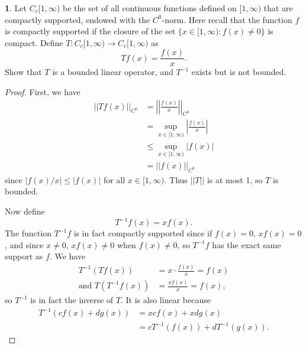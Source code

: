 \documentclass[12pt]{article}
\theoremstyle{definition}
\newtheorem{ex}{}
\begin{document}
\begin{ex}
	Let $C_c[1, \infty)$ be the set of all continuous functions defined on $[1, \infty)$ that are compactly supported, endowed with the $C^0$-norm.
	Here recall that the function $f$ is compactly supported if the closure of the set $\lbrace x \in [1, \infty) : f(x) \neq 0 \rbrace$ is compact.
	Define $T : C_c[1, \infty) \to C_c[1, \infty)$ as \begin{equation*}
		Tf(x) = \frac{f(x)}{x}.
	\end{equation*}
	Show that $T$ is a bounded linear operator, and $T^{-1}$ exists but is not bounded.
\end{ex}
\begin{proof}
	First, we have \begin{align*}
		||Tf(x)||_{C^0} & = \left| \left| \frac{f(x)}{x} \right| \right|_{C^0}     \\
		                & = \sup_{x \in [1, \infty)} \left| \frac{f(x)}{x} \right| \\
		                & \leq \sup_{x \in [1, \infty)} \left| f(x) \right|        \\
		                & = \left| \left| f(x) \right| \right|_{C^0}
	\end{align*}
	since $|f(x)/x| \leq |f(x)|$ for all $x \in [1, \infty)$.
	Thus $||T||$ is at most 1, so $T$ is bounded.

	Now define \begin{equation*}
		T^{-1}f(x) = xf(x).
	\end{equation*}
	The function $T^{-1}f$ is in fact compactly supported since if $f(x) = 0$, $xf(x) = 0$, and since $x \neq 0$, $xf(x) \neq 0$ when $f(x) \neq 0$, so $T^{-1}f$ has the exact same support as $f$.
	We have \begin{align*}
		T^{-1}(Tf(x))             & = x \cdot \frac{f(x)}{x} = f(x) \\
		\text{and } T(T^{-1}f(x)) & = \frac{xf(x)}{x} = f(x),
	\end{align*}
	so $T^{-1}$ is in fact the inverse of $T$.
	It is also linear because \begin{align*}
		T^{-1}(cf(x) + dg(x)) & = xcf(x) + xdg(x)                \\
		                      & = cT^{-1}(f(x)) + dT^{-1}(g(x)).
	\end{align*}


\end{proof}
\end{document}
